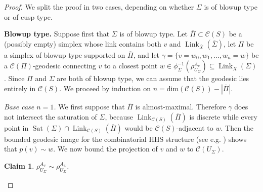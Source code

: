 \documentclass[svgnames]{amsart}
\theoremstyle{plain}
\newtheorem{claim}[thm]{Claim}
\theoremstyle{definition}
\newcommand{\C}[1]{\mathcal{C}(#1)}
\newcommand{\link}[2]{\operatorname{Link}_{#1}\left(#2\right)}
\newcommand{\Sat}{\operatorname{Sat}}
\newcommand{\ov}[1]{\overline{#1}}
\begin{document}
    \begin{proof} We split the proof in two cases, depending on whether $\Sigma$ is of blowup type or of cusp type.
    
\par\medskip
    \textbf{Blowup type.} Suppose first that $\Sigma$ is of blowup type. Let $\ov \Pi\subset \C S$ be a (possibly empty) simplex whose link contains both $v$ and $\link{\ov X}{\ov \Sigma}$, let $\Pi$ be a simplex of blowup type supported on $\ov \Pi$, and let $\gamma=\{v=w_0,w_1,\ldots,w_n=w\}$ be a $\C\Pi$-geodesic connecting $v$ to a closest point $w\in \phi_\Sigma^{-1}(\rho^{A_v}_{U_\Sigma})\subseteq \link{X}{\Sigma}$. Since $\Pi$ and $\Sigma$ are both of blowup type, we can assume that the geodesic lies entirely in $\C S$. We proceed by induction on $n=\text{dim}(\C S)-|\ov\Pi|$. 
    \par\medskip 
    \emph{Base case $n=1$.} We first suppose that $\ov\Pi$ is almost-maximal. Therefore $\gamma$ does not intersect the saturation of $\Sigma$, because $\link{\C S}{\ov \Pi}$ is discrete while every point in $\Sat(\Sigma)\cap \link{\C S}{\ov \Pi}$ would be $\C S$-adjacent to $w$. Then the bounded geodesic image for the combinatorial HHS structure (see e.g. \cite[Lemma 1.26]{short_HHG:I}) shows that $p(v)\sim w$. We now bound the projection of $v$ and $w$ to $\C{U_\Sigma}$.
    
    \begin{claim}\label{claim:projections_on_surface_are_close}
        $\rho^{A_v}_{U_\Sigma}\sim \rho^{A_w}_{U_\Sigma}$.
    \end{claim}


\end{proof}
\end{document}
